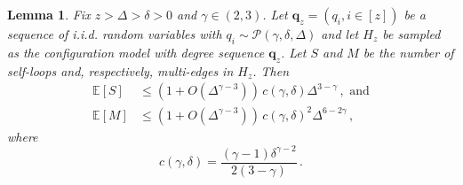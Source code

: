 \documentclass[12pt]{article}
\newtheorem{lemma}[theorem]{Lemma}
\theoremstyle{definition}
\theoremstyle{remark}
\theoremstyle{remark}
\numberwithin{theorem}{section}
\newcommand{\E}[1]{{\mathbb E}\left[#1\right]}
\newcommand{\tpl}[3]{\ensuremath{\mathcal{P}\left(#1,#2,#3\right)}}
\begin{document}
\begin{lemma} \label{lem:community loops and multi-edges}
Fix $z > \Delta > \delta > 0$ and $\gamma \in (2,3)$. Let $\mathbf{q}_z = (q_i,i \in [z])$ be a sequence of i.i.d. random variables with $q_i \sim \tpl{\gamma}{\delta}{\Delta}$ and let $H_z$ be sampled as the configuration model with degree sequence $\mathbf{q}_z$. Let $S$ and $M$ be the number of self-loops and, respectively, multi-edges in $H_z$. Then
\begin{align*}
\E{S} &\leq (1+O(\Delta^{\gamma-3})) \, c(\gamma,\delta) \Delta^{3-\gamma} \,, \text{ and}\\
\E{M} &\leq (1+O(\Delta^{\gamma-3})) \, c(\gamma,\delta)^2 \Delta^{6-2\gamma} \,,
\end{align*}
where 
\[
c(\gamma,\delta) = \frac{(\gamma-1)\delta^{\gamma-2}}{2(3-\gamma)} \,.
\]
\end{lemma}
\end{document}
